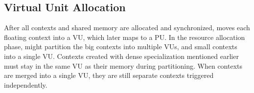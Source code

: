 \subsection{Virtual Unit Allocation}
After all contexts and shared memory are allocated and synchronized, 
\name moves each floating context into a VU, which later maps to a PU.
In the resource allocation phase, \name might partition the big contexts into multiple VUs, and small contexts into a single VU. 
Contexts created with dense specialization mentioned earlier must stay in the same VU as their
memory during partitioning.
When contexts are merged into a single VU, they are still
separate contexts triggered independently.
